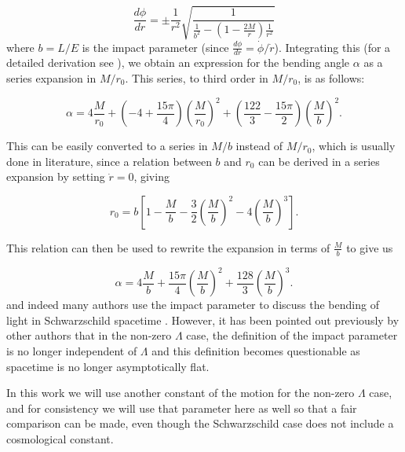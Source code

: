 \begin{equation}
  \frac{d\phi}{dr} = \pm \frac{1}{r^2} \sqrt{\frac{1}{ \frac{1}{b^2} - \left (1- \frac{2M}{r} \right )\frac{1}{r^2} }}
  \label{eq:dphi-dr}
\end{equation}
where $b = L/E$ is the impact parameter (since $\frac{d\phi}{dr} = \dot{\phi}/\dot{r}$). Integrating this (for a detailed derivation see \cite{keeton2005formalism}), we obtain an expression for the bending angle $\alpha$ as a series expansion in $M/r_0$. This series, to third order in $M/r_0$, is as follows:

\begin{equation}
  \alpha = 4 \frac{M}{r_0} + \left ( -4 + \frac{15\pi}{4} \right )\left ( \frac{M}{r_0}\right )^2 + \left ( \frac{122}{3} - \frac{15\pi}{2} \right )\left ( \frac{M}{b}\right )^2.
  \label{eq:lensing-series-expansion-r0}
\end{equation}

This can be easily converted to a series in $M/b$ instead of $M/r_0$, which is usually done in literature, since a relation between $b$ and $r_0$ can be derived in a series expansion by setting $\dot{r} = 0$, giving \citep{keeton2005formalism}

\begin{equation}
  r_0 = b \left [ 1 - \frac{M}{b} - \frac{3}{2} \left ( \frac{M}{b}\right)^2 - 4\left ( \frac{M}{b}\right)^3 \right ].
  \label{eq:b-r0-relation}
\end{equation} 

This relation can then be used to rewrite the expansion in terms of $\frac{M}{b}$ to give us

\begin{equation}
  \alpha = 4 \frac{M}{b} + \frac{15\pi}{4} \left ( \frac{M}{b} \right )^2 + \frac{128}{3} \left ( \frac{M}{b} \right )^3.
  \label{eq:series-expansion-b}
\end{equation}
and indeed many authors use the impact parameter to discuss the bending of light in Schwarzschild spacetime \citep{wald2010general,misner2017gravitation,butcher2016no}. However, it has been pointed out previously by other authors \citep{ishak2008new,hammad2013note,lebedev2013influence} that in the non-zero $\Lambda$ case, the definition of the impact parameter is no longer independent of $\Lambda$ and this definition becomes questionable as spacetime is no longer asymptotically flat. 

In this work we will use another constant of the motion for the non-zero $\Lambda$ case, and for consistency we will use that parameter here as well so that a fair comparison can be made, even though the Schwarzschild case does not include a cosmological constant.

